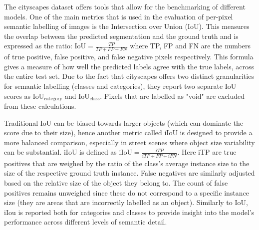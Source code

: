 The cityscapes dataset offers tools that allow for the benchmarking of different models. One of the main metrics that is used in the evaluation of per-pixel semantic labelling of images is the Intersection over Union (IoU). This measures the overlap between the predicted segmentation and the ground truth and is expressed as the ratio: $\text{IoU} = \frac{TP}{TP + FP + FN}$ where TP, FP and FN are the numbers of true positive, false positive, and false negative pixels respectively. This formula gives a measure of how well the predicted labels agree with the true labels, across the entire test set. Due to the fact that cityscapes offers two distinct granularities for semantic labelling (classes and categories), they report two separate IoU scores as IoU$_\text{category}$ and IoU$_\text{class}$. Pixels that are labelled as "void" are excluded from these calculations. 

Traditional IoU can be biased towards larger objects (which can dominate the score due to their size), hence another metric called iIoU is designed to provide a more balanced comparison, especially in street scenes where object size variability can be substantial. iIoU is defined as $\text{iIoU} = \frac{iTP}{iTP + FP + iFN}$. Here iTP are true positives that are weighed by the ratio of the class's average instance size to the size of the respective ground truth instance. False negatives are similarly adjusted based on the relative size of the object they belong to. The count of false positives remains unweighed since these do not correspond to a specific instance size (they are areas that are incorrectly labelled as an object). Similarly to IoU, iIou is reported both for categories and classes to provide insight into the model's performance across different levels of semantic detail.